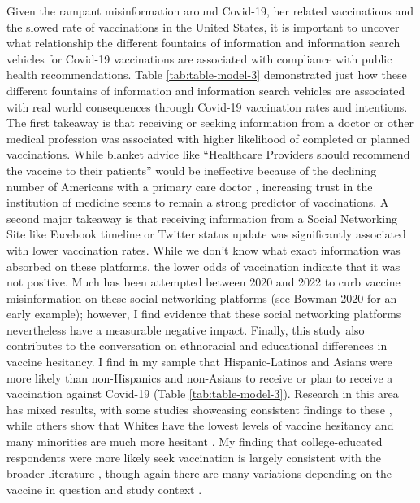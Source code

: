 Given the rampant misinformation around Covid-19, her related vaccinations
\citep{pathakInfodemicsCOVID19Role2020, mottaHowRightLeaningMedia2020, shahsavariConspiracyTimeCorona2020}
and the slowed rate of vaccinations in the
United States, it is important to uncover what relationship the different
fountains of information and information search vehicles for Covid-19 vaccinations
are associated with compliance with public health recommendations. Table
\ref{tab:table-model-3} demonstrated just how these different fountains of
information and information search vehicles are associated with real world
consequences through Covid-19 vaccination rates and intentions. The first
takeaway is that receiving or seeking information from a doctor or other medical
profession was associated with higher likelihood of completed or planned vaccinations.
While blanket advice like ``Healthcare Providers should recommend the vaccine to
their patients'' would be ineffective because of the declining number of
Americans with a primary care doctor \citep{levine_etal20}, increasing trust in the
institution of medicine seems to remain a strong predictor of vaccinations.
A second major takeaway is that receiving information from a Social Networking
Site like Facebook timeline or Twitter status update was significantly
associated with lower vaccination rates. While we don't know what exact
information was absorbed on these platforms, the lower odds of vaccination
indicate that it was not positive. Much has been attempted between 2020 and 2022
to curb vaccine misinformation on these social networking platforms (see Bowman 2020 for an early example); however, I find evidence that these social
networking platforms nevertheless have a measurable negative impact. Finally,
this study also contributes to the conversation on ethnoracial and
educational differences in vaccine hesitancy. I find in my sample that
Hispanic-Latinos and Asians were more likely than non-Hispanics and non-Asians
to receive or plan to receive a vaccination against Covid-19 (Table
\ref{tab:table-model-3}). Research in this area has mixed results, with some
studies showcasing consistent findings to these \citep{bagasra_etal21,king_etal21},
while others show that Whites have the lowest levels of vaccine hesitancy and
many minorities are much more hesitant \citep{momplaisir_etal21, foxworth21}. My finding that college-educated respondents were more likely seek vaccination is largely consistent with the broader literature
\citep{khairat_etal22}, though again there are many variations depending on the vaccine
in question and study context \citep{siddiqui_etal13}.

